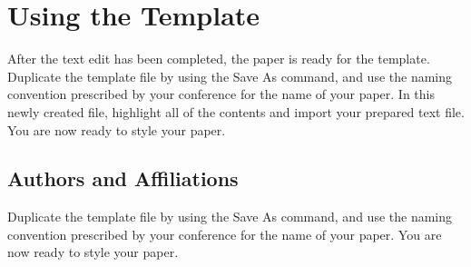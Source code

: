 \documentclass[conference,flushend]{iaria-lite}
\begin{document}
\section{Using the Template}
After the text edit has been completed, the paper is ready for the template. Duplicate the template file by using the Save As command, and use the naming convention prescribed by your conference for the name of your paper. In this newly created file, highlight all of the contents and import your prepared text file. You are now ready to style your paper.

\subsection{Authors and Affiliations}
Duplicate the template file by using the Save As command, and use the naming convention prescribed by your conference for the name of your paper. You are now ready to style your paper.

\end{document}
